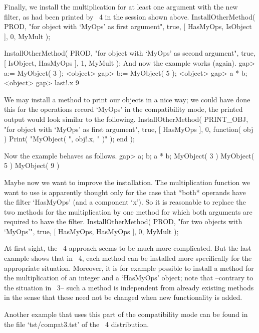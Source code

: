 Finally, we install the multiplication for at least one argument
with the new filter, as had been printed by {\GAP}~4 in the
session shown above.
\begintt
InstallOtherMethod( PROD,
    "for object with `MyOps' as first argument",
    true,
    [ HasMyOps, IsObject ], 0,
    MyMult );

InstallOtherMethod( PROD,
    "for object with `MyOps' as second argument",
    true,
    [ IsObject, HasMyOps ], 1,
    MyMult );
\endtt
And now the example works (again).
\begintt
gap> a:= MyObject( 3 );
<object>
gap> b:= MyObject( 5 );
<object>
gap> a * b;
<object>
gap> last!.x
9
\endtt

We may install a method to print our objects in a nice way;
we could have done this for the operations record `MyOps'
in the compatibility mode,
the printed output would look similar to the following.
\begintt
InstallOtherMethod( PRINT_OBJ,
    "for object with `MyOps' as first argument",
    true,
    [ HasMyOps ], 0,
    function( obj ) Print( "MyObject( ", obj!.x, " )" ); end );
\endtt

Now the example behaves as follows.
\begintt
gap> a;  b;  a * b;
MyObject( 3 )
MyObject( 5 )
MyObject( 9 )
\endtt

Maybe now we want to improve the installation.
The multiplication function we want to use is apparently
thought only for the case that *both* operands have
the filter `HasMyOps' (and a component `x').
So it is reasonable to replace the two methods for
the multiplication by one method for which both arguments
are required to have the filter.
\begintt
InstallOtherMethod( PROD,
    "for two objects with `MyOps'",
    true,
    [ HasMyOps, HasMyOps ], 0,
    MyMult );
\endtt

At first sight, the {\GAP}~4 approach seems to be much more
complicated.
But the last example shows that in {\GAP}~4,
each method can be installed more specifically for the appropriate
situation.
Moreover, it is for example possible to install a method
for the multiplication of an integer and a `HasMyOps' object;
note that --contrary to the situation in {\GAP}~3--
such a method is independent from already existing methods
in the sense that these need not be changed when
new functionality is added.

Another example that uses this part of the compatibility mode can be
found in the file `tst/compat3.tst' of the {\GAP}~4 distribution.



